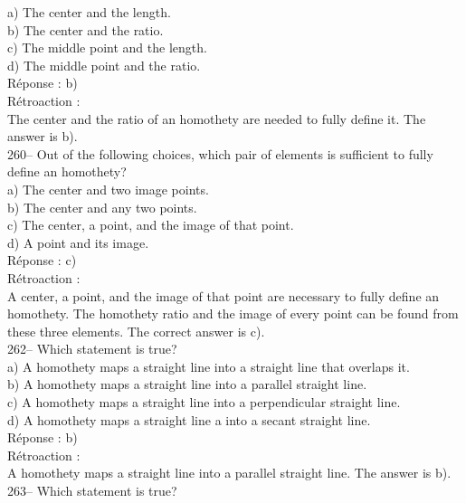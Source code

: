 \documentclass[letterpaper, 12pt]{article}
\begin{document}
a) The center and the length.\\
b) The center and the ratio.\\
c) The middle point and the length.\\
d) The middle point and the ratio.\\

R\'eponse : b)\\

R\'etroaction :\\
The center and the ratio of an homothety are needed to fully define
it. The answer is b). \\

260-- Out of the following choices, which pair of elements is
sufficient to fully define an homothety?\\

a) The center and two image points.\\
b) The center and any two points.\\
c) The center, a point, and the image of that point.\\
d) A point and its image.\\

R\'eponse : c)\\

R\'etroaction :\\
A center, a point, and the image of that point are necessary to
fully define an homothety. The homothety ratio and the image of
every point can be found from these three elements. The correct answer is c).\\


262-- Which statement is true?\\

a) A homothety maps a straight line into a straight line that overlaps it.\\
b) A homothety maps a straight line into a parallel straight line.\\
c) A homothety maps a straight line into a perpendicular straight
line.\\
d) A homothety maps a straight line a into a secant straight line.\\

R\'eponse : b)\\

R\'etroaction : \\
A homothety maps a straight line into a parallel straight line. The
answer is b).\\

263--  Which statement is true?\\
\end{document}
